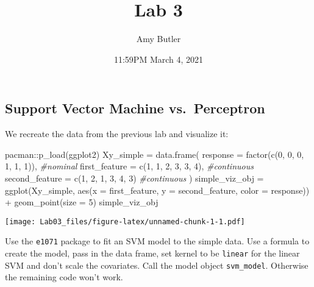 \documentclass[
]{article}
\title{Lab 3}
\author{Amy Butler}
\date{11:59PM March 4, 2021}
\newenvironment{Shaded}{\begin{snugshade}}{\end{snugshade}}
\newcommand{\AttributeTok}[1]{\textcolor[rgb]{0.77,0.63,0.00}{#1}}
\newcommand{\CommentTok}[1]{\textcolor[rgb]{0.56,0.35,0.01}{\textit{#1}}}
\newcommand{\DecValTok}[1]{\textcolor[rgb]{0.00,0.00,0.81}{#1}}
\newcommand{\FunctionTok}[1]{\textcolor[rgb]{0.00,0.00,0.00}{#1}}
\newcommand{\NormalTok}[1]{#1}
\newcommand{\OtherTok}[1]{\textcolor[rgb]{0.56,0.35,0.01}{#1}}
\newcommand{\SpecialCharTok}[1]{\textcolor[rgb]{0.00,0.00,0.00}{#1}}
\begin{document}
\maketitle

\hypertarget{support-vector-machine-vs.-perceptron}{%
\subsection{Support Vector Machine
vs.~Perceptron}\label{support-vector-machine-vs.-perceptron}}

We recreate the data from the previous lab and visualize it:

\begin{Shaded}
\begin{Highlighting}[]
\NormalTok{pacman}\SpecialCharTok{::}\FunctionTok{p\_load}\NormalTok{(ggplot2)}
\NormalTok{Xy\_simple }\OtherTok{=} \FunctionTok{data.frame}\NormalTok{(}
  \AttributeTok{response =} \FunctionTok{factor}\NormalTok{(}\FunctionTok{c}\NormalTok{(}\DecValTok{0}\NormalTok{, }\DecValTok{0}\NormalTok{, }\DecValTok{0}\NormalTok{, }\DecValTok{1}\NormalTok{, }\DecValTok{1}\NormalTok{, }\DecValTok{1}\NormalTok{)), }\CommentTok{\#nominal}
  \AttributeTok{first\_feature =} \FunctionTok{c}\NormalTok{(}\DecValTok{1}\NormalTok{, }\DecValTok{1}\NormalTok{, }\DecValTok{2}\NormalTok{, }\DecValTok{3}\NormalTok{, }\DecValTok{3}\NormalTok{, }\DecValTok{4}\NormalTok{),    }\CommentTok{\#continuous}
  \AttributeTok{second\_feature =} \FunctionTok{c}\NormalTok{(}\DecValTok{1}\NormalTok{, }\DecValTok{2}\NormalTok{, }\DecValTok{1}\NormalTok{, }\DecValTok{3}\NormalTok{, }\DecValTok{4}\NormalTok{, }\DecValTok{3}\NormalTok{)    }\CommentTok{\#continuous}
\NormalTok{)}
\NormalTok{simple\_viz\_obj }\OtherTok{=} \FunctionTok{ggplot}\NormalTok{(Xy\_simple, }\FunctionTok{aes}\NormalTok{(}\AttributeTok{x =}\NormalTok{ first\_feature, }\AttributeTok{y =}\NormalTok{ second\_feature, }\AttributeTok{color =}\NormalTok{ response)) }\SpecialCharTok{+} 
  \FunctionTok{geom\_point}\NormalTok{(}\AttributeTok{size =} \DecValTok{5}\NormalTok{)}
\NormalTok{simple\_viz\_obj}
\end{Highlighting}
\end{Shaded}

\texttt{[image: Lab03\_files/figure-latex/unnamed-chunk-1-1.pdf]}

Use the \texttt{e1071} package to fit an SVM model to the simple data.
Use a formula to create the model, pass in the data frame, set kernel to
be \texttt{linear} for the linear SVM and don't scale the covariates.
Call the model object \texttt{svm\_model}. Otherwise the remaining code
won't work.
\end{document}
